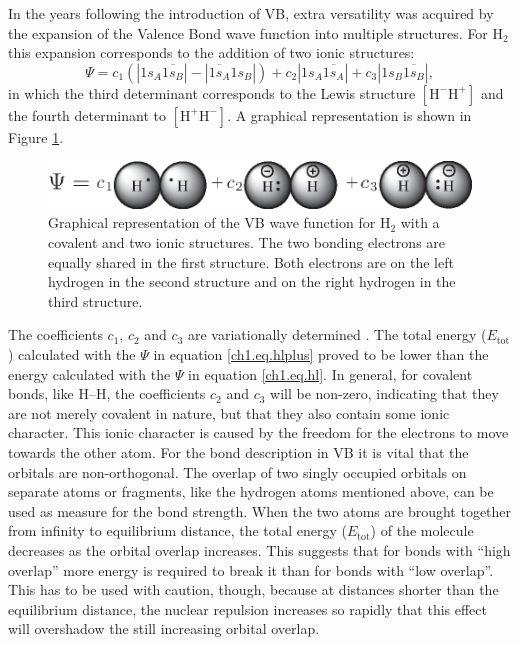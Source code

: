 In the years following the introduction of VB, extra versatility was acquired by the expansion of the Valence Bond wave function into multiple structures. For H$_2$ this expansion corresponds to the addition of two ionic structures:
\begin{equation}
\Psi = c_1 (|1s_{A}\overline{1s_{B}}| - |\overline{1s_{A}}1s_{B}|) + c_2 |1s_{A}\overline{1s_{A}}| + c_3 |1s_{B}\overline{1s_{B}}|,
\label{ch1.eq.hlplus}
\end{equation}
in which the third determinant corresponds to the Lewis structure $\mathrm{[H^{-} H^{+}]}$ and the fourth determinant to $\mathrm{[H^{+} H^{-}]}$. A graphical representation is shown in Figure \ref{ch1.fig.heitlerplus}.
\begin{figure}[htp]
\center
\includegraphics[scale=1]{introduction/figures/heitlerplus.eps}
\caption{Graphical representation of the VB wave function for $\mathrm{H_2}$ with a covalent and two ionic structures. The two bonding electrons are equally shared in the first structure. Both electrons are on the left hydrogen in the second structure and on the right hydrogen in the third structure.}
\label{ch1.fig.heitlerplus}   
\end{figure}
The coefficients $c_1$, $c_2$ and $c_3$ are variationally determined \cite{varia}. The total energy ($E_\mathrm{tot}$) calculated with the $\Psi$ in equation \ref{ch1.eq.hlplus} proved to be lower than the energy calculated with the $\Psi$ in equation \ref{ch1.eq.hl}. In general, for covalent bonds, like H--H, the coefficients $c_2$ and $c_3$ will be non-zero, indicating that they are not merely covalent in nature, but that they also contain some ionic character. This ionic character is caused by the freedom for the electrons to move towards the other atom. For the bond description in VB it is vital that the orbitals are non-orthogonal. The overlap of two singly occupied orbitals on separate atoms or fragments, like the hydrogen atoms mentioned above, can be used as measure for the bond strength. When the two atoms are brought together from infinity to equilibrium distance, the total energy ($E_\mathrm{tot}$) of the molecule decreases as the orbital overlap increases. This suggests that for bonds with ``high overlap'' more energy is required to break it than for bonds with ``low overlap''. This has to be used with caution, though, because at distances shorter than the equilibrium distance, the nuclear repulsion increases so rapidly that this effect will overshadow the still increasing orbital overlap.

